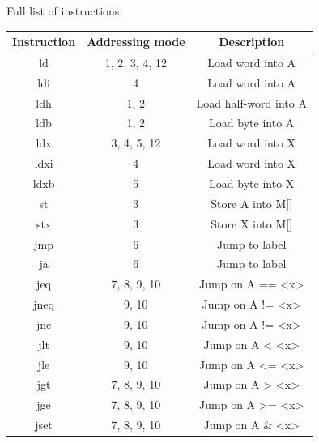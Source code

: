 Full list of instructions:
\begin{center}
 \begin{tabular}{||c c c||} 
 \hline
 Instruction & Addressing mode & Description \\ [0.5ex] 
 \hline\hline
  ld & 1, 2, 3, 4, 12 & Load word into A \\
  \hline
  ldi &  4 & Load word into A \\
  \hline
  ldh &  1, 2 & Load half-word into A \\
  \hline
  ldb & 1, 2 & Load byte into A \\
  \hline
  ldx & 3, 4, 5, 12 & Load word into X \\
  \hline
  ldxi & 4 & Load word into X \\
  \hline
  ldxb & 5 & Load byte into X \\
  \hline
  \hline
  st & 3 & Store A into M[] \\
  \hline
  stx & 3 & Store X into M[] \\
  \hline
  \hline
  jmp & 6 & Jump to label \\
  \hline
  ja & 6 & Jump to label \\
  \hline
  jeq & 7, 8, 9, 10 & Jump on A == <x> \\
  \hline
  jneq & 9, 10 & Jump on A != <x> \\
  \hline
  jne & 9, 10 & Jump on A != <x> \\
  \hline
  jlt & 9, 10 & Jump on A <  <x> \\
  \hline
  jle & 9, 10 & Jump on A <= <x> \\
  \hline
  jgt & 7, 8, 9, 10 & Jump on A >  <x> \\
  \hline
  jge & 7, 8, 9, 10 & Jump on A >= <x> \\
  \hline
  jset & 7, 8, 9, 10 & Jump on A \&  <x> \\
  \hline
\end{tabular}
\end{center}

